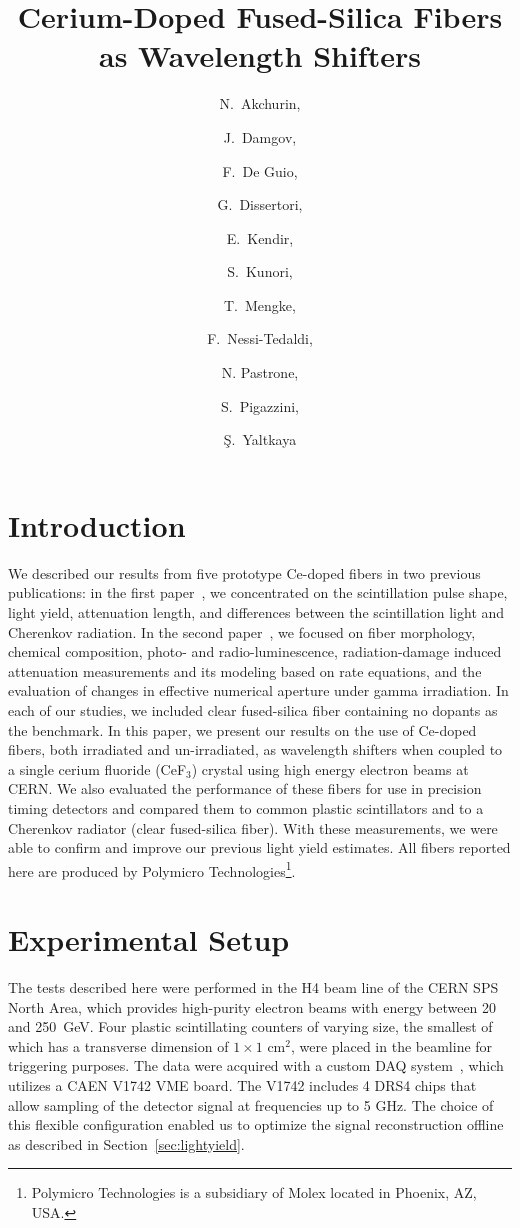 \documentclass[a4paper,11pt]{article}
\title{\boldmath  Cerium-Doped Fused-Silica Fibers
as Wavelength Shifters}
\author[a,1]{N.~Akchurin,\note{Corresponding author.}}
\author[a]{J.~Damgov,}
\author[a]{F.~De Guio,}
\author[c]{G.~Dissertori,}
\author[b]{E.~Kendir,}
\author[a]{S.~Kunori,}
\author[a]{T.~Mengke,}
\author[c]{F.~Nessi-Tedaldi,}
\author[d]{N. Pastrone,}
\author[c]{S.~Pigazzini,}
\author[b]{\c{S}.~Yaltkaya}
\affiliation[a]{Texas Tech University, Department of Physics and Astronomy,  Lubbock, TX, 79409, USA}
\affiliation[b]{Akdeniz University, Department of Physics, Antalya, 07070, Turkey}
\affiliation[c]{ETH, Z\"urich, Switzerland}
\affiliation[d]{INFN-Torino, Italy}
\begin{document}
\maketitle
\flushbottom

\section{Introduction}
\label{sec:intro}
We described our results from five prototype Ce-doped fibers in two previous publications:  in the first paper~\cite{JINSTPaper}, we concentrated on the scintillation pulse shape, light yield, attenuation length, and differences between the scintillation light and Cherenkov radiation.  In the second paper~\cite{JINSTPaper2}, we focused on fiber morphology, chemical composition, photo- and radio-luminescence, radiation-damage induced attenuation measurements and its modeling based on rate equations, and the evaluation of changes in effective numerical aperture under gamma irradiation.   In each of our studies, we included clear fused-silica fiber containing no dopants  as the benchmark. In this paper, we present our results on the use of Ce-doped fibers, both irradiated and un-irradiated, as wavelength shifters when coupled to a single cerium fluoride (CeF$_3$) crystal using high energy electron beams at CERN.  We also evaluated the performance of these fibers for use in precision timing detectors and compared them to common plastic scintillators and to a Cherenkov radiator (clear fused-silica fiber).  With these measurements, we were able to confirm and improve our previous light yield estimates.  All fibers reported here are produced by Polymicro Technologies\footnote{Polymicro Technologies is a subsidiary of Molex located in Phoenix, AZ, USA.}.

\section{Experimental Setup}
\label{sec:experimentalsetup}


The tests described here were performed in the H4 beam line of the CERN SPS North Area, which provides high-purity electron beams with energy between 20 and 250~GeV.  Four plastic scintillating counters of varying size, the smallest of which has a transverse dimension of $1 \times 1$ cm$^2$, were placed in the beamline for triggering purposes.  The data were acquired with a custom DAQ system~\cite{r-MAR}, which utilizes a CAEN V1742 VME board. The V1742 includes 4 DRS4 chips that allow sampling of the detector signal at frequencies up to 5 GHz. The choice of this flexible configuration enabled us to optimize the signal reconstruction offline as described in Section~\ref{sec:lightyield}.
\end{document}
